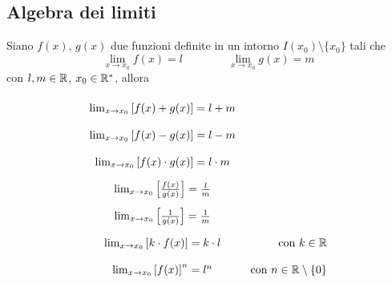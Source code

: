 \subsection{Algebra dei limiti}
\begin{shadedTheorem}
    Siano $f(x)$, $g(x)$ due funzioni definite in un intorno $I(x_0)\setminus \{x_0\}$ tali che
    \[\lim_{x\to x_0}f(x)=l\qquad \qquad \lim_{x\to x_0}g(x)=m\]
    con $l,m\in \mathbb{R}$, $x_0\in \mathbb{R}^\ast$, allora
    \[\renewcommand{\arraystretch}{2}
        \begin{array}{cr}
        \lim_{x\to x_0}\left[ f(x) + g(x) \right] = l + m\\
        \lim_{x\to x_0}\left[ f(x) - g(x) \right] = l - m\\
        \lim_{x\to x_0}\left[ f(x) \cdot g(x) \right] = l \cdot m\\
        \lim_{x\to x_0}\left[ \frac{f(x)}{g(x)} \right] = \frac{l}{m}\\
        \lim_{x\to x_0}\left[ \frac{1}{g(x)} \right] = \frac{1}{m}\\
        \lim_{x\to x_0}\left[ k\cdot f(x)\right] = k\cdot l & \qquad\text{ con }k\in \R\\
        \lim_{x\to x_0}\left[ f(x) \right]^n = l^n & \text{ con }n\in \R\setminus\{0\}
    \end{array}\]
\end{shadedTheorem}
